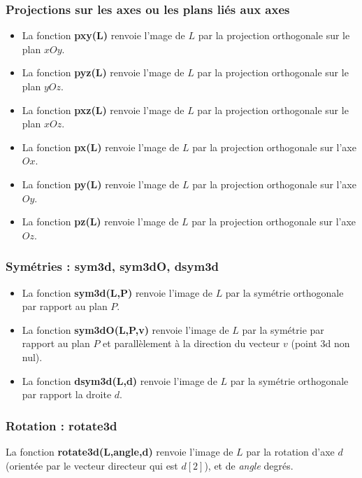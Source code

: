 \subsubsection{Projections sur les axes ou les plans liés aux axes}

\begin{itemize}
    \item La fonction \textbf{pxy(L)} renvoie l'mage de $L$ par la projection orthogonale sur le plan $xOy$.
    \item La fonction \textbf{pyz(L)} renvoie l'mage de $L$ par la projection orthogonale sur le plan $yOz$.
    \item La fonction \textbf{pxz(L)} renvoie l'mage de $L$ par la projection orthogonale sur le plan $xOz$.
\item La fonction \textbf{px(L)} renvoie l'mage de $L$ par la projection orthogonale sur l'axe $Ox$.
\item La fonction \textbf{py(L)} renvoie l'mage de $L$ par la projection orthogonale sur l'axe $Oy$.
\item La fonction \textbf{pz(L)} renvoie l'mage de $L$ par la projection orthogonale sur l'axe $Oz$.
\end{itemize}

\subsubsection{Symétries : sym3d, sym3dO, dsym3d}

\begin{itemize}
    \item La fonction \textbf{sym3d(L,P)} renvoie l'image de $L$ par la symétrie orthogonale par rapport au plan $P$.
    \item La fonction \textbf{sym3dO(L,P,v)} renvoie l'image de $L$ par la symétrie par rapport au plan $P$ et parallèlement à la direction du vecteur $v$ (point 3d non nul).
    \item La fonction \textbf{dsym3d(L,d)} renvoie l'image de $L$ par la symétrie orthogonale par rapport la droite $d$.
\end{itemize}

\subsubsection{Rotation : rotate3d}

La fonction \textbf{rotate3d(L,angle,d)} renvoie l'image de $L$ par la rotation d'axe $d$ (orientée par le vecteur directeur qui est $d[2]$), et de \emph{angle} degrés.

